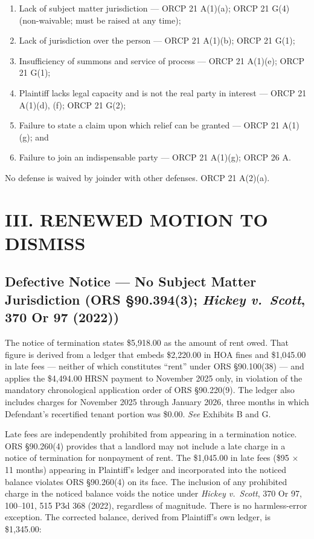 \documentclass[12pt,letterpaper]{article}
\begin{document}
	\begin{enumerate}[label=(\alph*)]
		\item Lack of subject matter jurisdiction --- ORCP 21 A(1)(a); ORCP 21 G(4) (non-waivable; must be raised at any time);
		\item Lack of jurisdiction over the person --- ORCP 21 A(1)(b); ORCP 21 G(1);
		\item Insufficiency of summons and service of process --- ORCP 21 A(1)(e); ORCP 21 G(1);
		\item Plaintiff lacks legal capacity and is not the real party in interest --- ORCP 21 A(1)(d), (f); ORCP 21 G(2);
		\item Failure to state a claim upon which relief can be granted --- ORCP 21 A(1)(g); and
		\item Failure to join an indispensable party --- ORCP 21 A(1)(g); ORCP 26 A.
	\end{enumerate}
	
	No defense is waived by joinder with other defenses. ORCP 21 A(2)(a).
	
	\section*{III. RENEWED MOTION TO DISMISS}
	
	\subsection{Defective Notice --- No Subject Matter Jurisdiction (ORS \S90.394(3); \textit{Hickey v.\ Scott}, 370 Or 97 (2022))}
	
	The notice of termination states \$5,918.00 as the amount of rent owed. That figure is derived from a ledger that embeds \$2,220.00 in HOA fines and \$1,045.00 in late fees --- neither of which constitutes ``rent'' under ORS \S90.100(38) --- and applies the \$4,494.00 HRSN payment to November 2025 only, in violation of the mandatory chronological application order of ORS \S90.220(9). The ledger also includes charges for November 2025 through January 2026, three months in which Defendant's recertified tenant portion was \$0.00. \textit{See} Exhibits B and G.
	
	Late fees are independently prohibited from appearing in a termination notice. ORS \S90.260(4) provides that a landlord may not include a late charge in a notice of termination for nonpayment of rent. The \$1,045.00 in late fees (\$95 $\times$ 11 months) appearing in Plaintiff's ledger and incorporated into the noticed balance violates ORS \S90.260(4) on its face. The inclusion of any prohibited charge in the noticed balance voids the notice under \textit{Hickey v.\ Scott}, 370 Or 97, 100--101, 515 P3d 368 (2022), regardless of magnitude. There is no harmless-error exception. The corrected balance, derived from Plaintiff's own ledger, is \$1,345.00:
	
\end{document}
